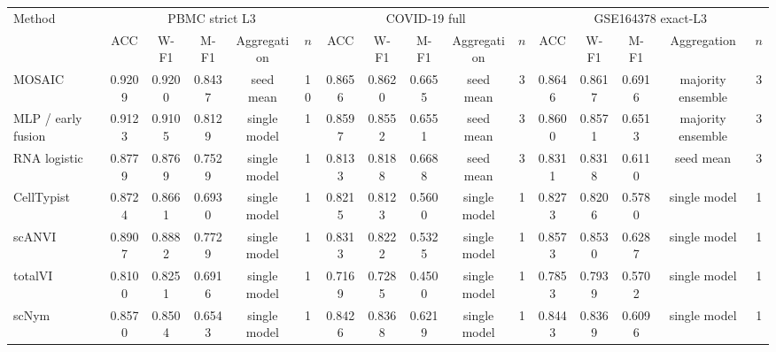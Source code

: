 \begin{tabular*}{1.04\textwidth}{@{\extracolsep{\fill}}l*{15}{c}@{}}
\toprule
Method & \multicolumn{5}{c}{PBMC strict L3} & \multicolumn{5}{c}{COVID-19 full} & \multicolumn{5}{c}{GSE164378 exact-L3} \\
\cmidrule(lr){2-6}\cmidrule(lr){7-11}\cmidrule(lr){12-16}
 & ACC & W-F1 & M-F1 & Aggregation & $n$ & ACC & W-F1 & M-F1 & Aggregation & $n$ & ACC & W-F1 & M-F1 & Aggregation & $n$ \\
\midrule
MOSAIC & 0.9209 & 0.9200 & 0.8437 & seed mean & 10 & 0.8656 & 0.8620 & 0.6655 & seed mean & 3 & 0.8646 & 0.8617 & 0.6916 & majority ensemble & 3 \\
MLP / early fusion & 0.9123 & 0.9105 & 0.8129 & single model & 1 & 0.8597 & 0.8552 & 0.6551 & seed mean & 3 & 0.8600 & 0.8571 & 0.6513 & majority ensemble & 3 \\
RNA logistic & 0.8779 & 0.8769 & 0.7529 & single model & 1 & 0.8133 & 0.8188 & 0.6688 & seed mean & 3 & 0.8311 & 0.8318 & 0.6110 & seed mean & 3 \\
CellTypist & 0.8724 & 0.8661 & 0.6930 & single model & 1 & 0.8215 & 0.8123 & 0.5600 & single model & 1 & 0.8273 & 0.8206 & 0.5780 & single model & 1 \\
scANVI & 0.8907 & 0.8882 & 0.7729 & single model & 1 & 0.8313 & 0.8222 & 0.5325 & single model & 1 & 0.8573 & 0.8530 & 0.6287 & single model & 1 \\
totalVI & 0.8100 & 0.8251 & 0.6916 & single model & 1 & 0.7169 & 0.7285 & 0.4500 & single model & 1 & 0.7853 & 0.7939 & 0.5702 & single model & 1 \\
scNym & 0.8570 & 0.8504 & 0.6543 & single model & 1 & 0.8426 & 0.8368 & 0.6219 & single model & 1 & 0.8443 & 0.8369 & 0.6096 & single model & 1 \\
\bottomrule
\end{tabular*}
